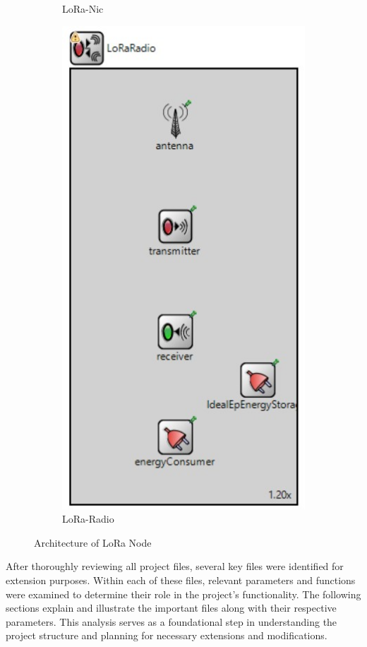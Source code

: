 \begin{figure}[h!]
\begin{subfigure}[b]{0,4\textwidth}
            \caption{LoRa-Nic}
            \label{fig:lora-nic}
            \end{subfigure}
            \hfill
            \begin{subfigure}[b]{0,4\textwidth}
            \centering
            \includegraphics[width=0.6\columnwidth]{images/radio.jpg}
            \caption{LoRa-Radio}
            \label{fig:lora-radio}
            \end{subfigure}
     
            \caption{Architecture of LoRa Node}
            \label{fig:Architecture of LoRa Node}
        
\end{figure}
\newpage
After thoroughly reviewing all project files, several key files were identified for extension purposes. Within each of these files, relevant parameters and functions were examined to determine their role in the project's functionality. The following sections explain and illustrate the important files along with their respective parameters. This analysis serves as a foundational step in understanding the project structure and planning for necessary extensions and modifications.\\

